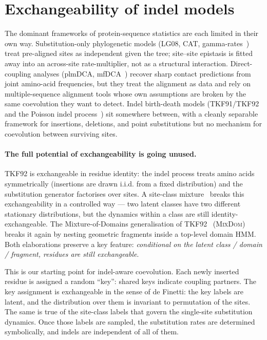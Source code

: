 \documentclass[11pt]{article}
\theoremstyle{definition}
\theoremstyle{remark}
\newcommand{\MixDom}{\textsc{MixDom}}
\begin{document}
\section{Exchangeability of indel models}
\label{sec:intro}

The dominant frameworks of protein-sequence statistics are each limited in their own way. Substitution-only phylogenetic models
(LG08, CAT, gamma-rates~\citep{LG08,lartillotcat,Yang1994a}) treat
pre-aligned sites as independent given the tree; site--site epistasis
is fitted away into an across-site rate-multiplier, not as a structural
interaction. Direct-coupling analyses
(plmDCA, mfDCA~\citep{Marks2011,Morcos2011,ekeberg2013}) recover sharp
contact predictions from joint amino-acid frequencies, but they
treat the alignment as data and rely on multiple-sequence alignment
tools whose own assumptions are broken by the same
coevolution they want to detect. Indel birth-death models
(TKF91/TKF92~\citep{ThorneEtAl91,ThorneEtAl92,Hein2000} and the Poisson
indel process~\citep{bouchardcote2013}) sit somewhere between, with a
cleanly separable framework for insertions, deletions, and point substitutions but no
mechanism for coevolution between surviving sites.

\paragraph{The full potential of exchangeability is going unused.}
TKF92 is exchangeable in residue identity: the indel process treats
amino acids symmetrically (insertions are drawn i.i.d. from a fixed
distribution) and the substitution generator factorises over sites.
A site-class mixture~\citep{lartillotcat} breaks this exchangeability
in a controlled way --- two latent classes have two different stationary
distributions, but the dynamics within a class are still
identity-exchangeable. The Mixture-of-Domains generalisation of
TKF92~\citep{LargeHolmes2026} (\MixDom) breaks it again by nesting
geometric fragments inside a top-level domain HMM. Both elaborations
preserve a key feature: \emph{conditional on the latent class /
domain / fragment, residues are still exchangeable}.

This is our starting point for indel-aware coevolution.
Each newly inserted residue is assigned a random ``key'': shared keys indicate coupling partners.
The key assignment is exchangeable in the sense of de Finetti: the key labels are latent, and the distribution over them is invariant to permutation of the sites. The same is true of the site-class labels that govern the single-site substitution dynamics.
Once those labels are sampled, the substitution rates are determined symbolically, and indels are independent of all of them.
\end{document}
